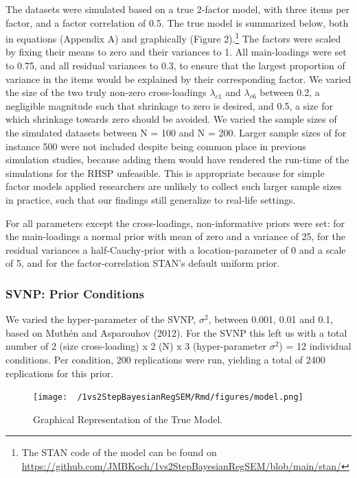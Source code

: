 \documentclass[
  man, donotrepeattitle,floatsintext]{apa6}
\begin{document}
The datasets were simulated based on a true 2-factor model, with three items per factor, and a factor correlation of 0.5. The true model is summarized below, both in equations (Appendix A) and graphically (Figure 2).\footnote{The STAN code of the model can be found on \url{https://github.com/JMBKoch/1vs2StepBayesianRegSEM/blob/main/stan/}} The factors were scaled by fixing their means to zero and their variances to 1. All main-loadings were set to 0.75, and all residual variances to 0.3, to ensure that the largest proportion of variance in the items would be explained by their corresponding factor. We varied the size of the two truly non-zero cross-loadings \(\lambda_{c 1}\) and \(\lambda_{c 6}\) between 0.2, a negligible magnitude such that shrinkage to zero is desired, and 0.5, a size for which shrinkage towards zero should be avoided. We varied the sample sizes of the simulated datasets between N = 100 and N = 200. Larger sample sizes of for instance 500 were not included despite being common place in previous simulation studies, because adding them would have rendered the run-time of the simulations for the RHSP unfeasible. This is appropriate because for simple factor models applied researchers are unlikely to collect such larger sample sizes in practice, such that our findings still generalize to real-life settings.

For all parameters except the cross-loadings, non-informative priors were set: for the main-loadings a normal prior with mean of zero and a variance of 25, for the residual variances a half-Cauchy-prior with a location-parameter of 0 and a scale of 5, and for the factor-correlation STAN's default uniform prior.

\hypertarget{svnp-prior-conditions}{%
\subsubsection{SVNP: Prior Conditions}\label{svnp-prior-conditions}}

We varied the hyper-parameter of the SVNP, \(\sigma^2\), between 0.001, 0.01 and 0.1, based on Muthén and Asparouhov (2012). For the SVNP this left us with a total number of 2 (size cross-loading) x 2 (N) x 3 (hyper-parameter \(\sigma^2\)) = 12 individual conditions. Per condition, 200 replications were run, yielding a total of 2400 replications for this prior.

\begin{figure}
\centering
\texttt{[image: ~/1vs2StepBayesianRegSEM/Rmd/figures/model.png]}
\caption{Graphical Representation of the True Model.}
\end{figure}
\end{document}
